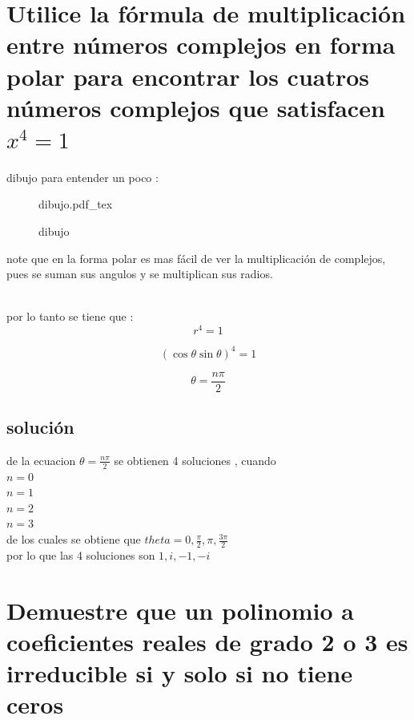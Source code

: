 \documentclass[10pt,a4paper]{article} %
\newcommand{\incfig}[1]{%
    \def\svgwidth{\columnwidth}
    {#1.pdf_tex}
}
\begin{document}
    \section{Utilice la fórmula de multiplicación entre números complejos en
    forma polar para encontrar los cuatros números complejos  que satisfacen $x ^{4}= 1   $ }
    dibujo para entender un poco :
    \\
        \begin{figure}[h]
            \centering
            \incfig{dibujo}
            \caption{dibujo}
        \end{figure}

        note que en la forma polar es mas fácil de ver la multiplicación de
        complejos, pues se suman sus angulos y se multiplican sus radios.

        \\ por lo tanto se tiene que :
        \begin{equation}
            r ^{4} = 1
        \end{equation}

        \begin{equation}
            ( \cos{\theta } \sin{\theta }) ^{4}  = 1
        \end{equation}

        \begin{equation}
            \theta  = \frac{n \pi }{2}
        \end{equation}

        \subsection{solución}

            de la ecuacion $ \theta  = \frac{n \pi }{2}  $ se obtienen 4 soluciones  , cuando
            \\ $ n = 0  $
            \\ $ n  = 1  $
            \\ $ n  = 2  $
            \\ $ n  =  3  $
            \\

            de los cuales se obtiene que $ theta = 0 , \frac{\pi }{2} , \pi  , \frac{3 \pi }{2}  $
            \\ por lo que las 4 soluciones son $ 1, i, -1 , -i  $

    \section{Demuestre que un polinomio a coeficientes reales de grado 2 o 3 es
    irreducible si y solo si no tiene ceros}
\end{document}
